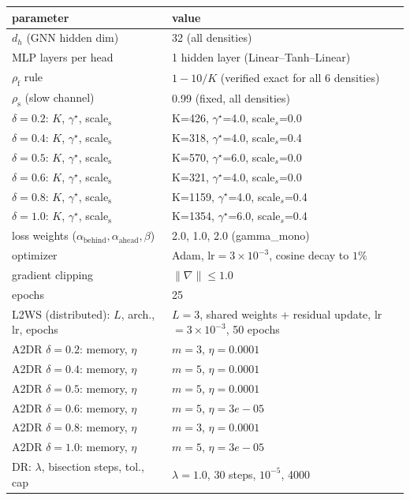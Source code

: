 
\begin{tabular}{ll}
\toprule
parameter & value \\
\midrule
$d_h$ (GNN hidden dim) & 32 (all densities) \\
MLP layers per head & 1 hidden layer (Linear--Tanh--Linear) \\
$\rho_{\mathrm f}$ rule & $1-10/K$ (verified exact for all 6 densities) \\
$\rho_{\mathrm s}$ (slow channel) & 0.99 (fixed, all densities) \\
$\delta=0.2$: $K$, $\gamma^\star$, scale$_{\mathrm s}$ & K=426, $\gamma^\star$=4.0, scale$_s$=0.0 \\
$\delta=0.4$: $K$, $\gamma^\star$, scale$_{\mathrm s}$ & K=318, $\gamma^\star$=4.0, scale$_s$=0.4 \\
$\delta=0.5$: $K$, $\gamma^\star$, scale$_{\mathrm s}$ & K=570, $\gamma^\star$=6.0, scale$_s$=0.0 \\
$\delta=0.6$: $K$, $\gamma^\star$, scale$_{\mathrm s}$ & K=321, $\gamma^\star$=4.0, scale$_s$=0.0 \\
$\delta=0.8$: $K$, $\gamma^\star$, scale$_{\mathrm s}$ & K=1159, $\gamma^\star$=4.0, scale$_s$=0.4 \\
$\delta=1.0$: $K$, $\gamma^\star$, scale$_{\mathrm s}$ & K=1354, $\gamma^\star$=6.0, scale$_s$=0.4 \\
loss weights ($\alpha_{\text{behind}},\alpha_{\text{ahead}},\beta$) & 2.0, 1.0, 2.0 (gamma_mono) \\
optimizer & Adam, lr$=3\times10^{-3}$, cosine decay to $1\%$ \\
gradient clipping & $\|\nabla\|\le 1.0$ \\
epochs & 25 \\
L2WS (distributed): $L$, arch., lr, epochs & $L=3$, shared weights + residual update, lr$=3\times10^{-3}$, 50 epochs \\
A2DR $\delta=0.2$: memory, $\eta$ & $m=3$, $\eta=0.0001$ \\
A2DR $\delta=0.4$: memory, $\eta$ & $m=5$, $\eta=0.0001$ \\
A2DR $\delta=0.5$: memory, $\eta$ & $m=5$, $\eta=0.0001$ \\
A2DR $\delta=0.6$: memory, $\eta$ & $m=5$, $\eta=3e-05$ \\
A2DR $\delta=0.8$: memory, $\eta$ & $m=3$, $\eta=0.0001$ \\
A2DR $\delta=1.0$: memory, $\eta$ & $m=5$, $\eta=3e-05$ \\
DR: $\lambda$, bisection steps, tol., cap & $\lambda=1.0$, 30 steps, $10^{-5}$, 4000 \\
\bottomrule
\end{tabular}
